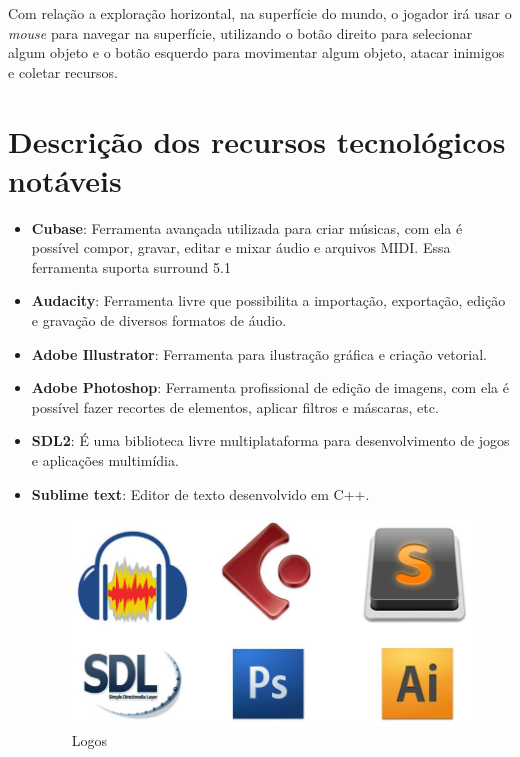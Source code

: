 \documentclass[11pt]{article} %
\begin{document}
Com relação a exploração horizontal, na superfície do mundo, o jogador irá usar o \textit{mouse} para navegar na superfície, utilizando o botão direito para selecionar algum objeto e o botão esquerdo para movimentar algum objeto, atacar inimigos e coletar recursos. 
\section*{Descrição dos recursos tecnológicos notáveis}

\begin{itemize}
\item \textbf{Cubase}: Ferramenta avançada utilizada para criar músicas, com ela é possível compor, gravar, editar e mixar áudio e arquivos MIDI. Essa ferramenta suporta surround 5.1

\item \textbf{Audacity}: Ferramenta livre que possibilita a importação, exportação, edição e gravação de diversos formatos de áudio.

\item \textbf{Adobe Illustrator}: Ferramenta para ilustração gráfica e criação vetorial.

\item \textbf{Adobe Photoshop}: Ferramenta profissional de edição de imagens, com ela é possível fazer recortes de elementos, aplicar filtros e máscaras, etc.

\item \textbf{SDL2}: É uma biblioteca livre multiplataforma para desenvolvimento de jogos e aplicações multimídia.

\item \textbf{Sublime text}: Editor de texto desenvolvido em C++.

\newpage

\begin{figure}[!htp]
\centering
\includegraphics[scale=0.6]{res/logos.jpg}
\caption{Logos}
\label{Logos}
\end{figure}

\end{itemize}
\end{document}

